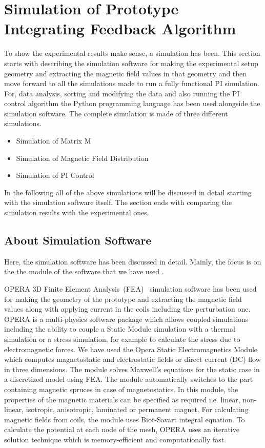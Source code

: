  
% 

\FloatBarrier
\section{Simulation of Prototype Integrating Feedback Algorithm}

To show the experimental results make sense, a simulation has been. This section starts with describing the simulation software for making the experimental setup geometry and extracting the magnetic field values in that geometry and then move forward to all the simulations made to run a fully functional PI simulation. For, data analysis, sorting  and modifying the data and also running the PI control algorithm the Python programming language has been used alongside the simulation software. The complete simulation is made of three different simulations. 

\begin{itemize}
    \item Simulation of Matrix M
    \item Simulation of Magnetic Field Distribution
    \item Simulation of PI Control
\end{itemize}
In the following  all of the above simulations  will be discussed in detail starting with the simulation software itself. The section ends with comparing the simulation results with the experimental ones.

\subsection{About Simulation Software}
Here, the simulation software has been discussed in detail. Mainly, the focus is on the the module of the software that we have used .

OPERA 3D Finite Element Analysis~(FEA)~\cite{opera} simulation software has been used for making the geometry of the prototype and extracting the magnetic field values along with applying current in the coils including the perturbation one. OPERA is a multi-physics software package which allows coupled simulations including the ability to couple a Static Module simulation with a thermal simulation or a stress simulation, for example to calculate the stress due to electromagnetic forces. We have used the Opera Static Electromagnetics Module which computes magnetostatic and electrostatic fields or direct current (DC) flow in three dimensions. The module solves Maxwell$'$s equations for the static case in a discretized model using FEA. The module automatically switches to the part containing magnetic spruces in case of magnetostatics. In this module, the properties of the magnetic materials can be specified as required i.e. linear, non-linear, isotropic, anisotropic, laminated or permanent magnet. For calculating magnetic fields from coils, the module uses Biot-Savart integral equation. To calculate the potential at each node of the mesh, OPERA uses an iterative solution technique which is memory-efficient and computationally fast.

